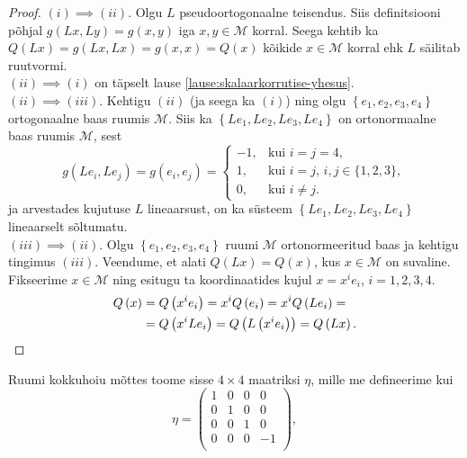 \documentclass[a4paper,12pt]{article}
\theoremstyle{plain}
\theoremstyle{definition}
\numberwithin{equation}{section}
\def\M{{\mathcal M}}
\begin{document}
\begin{proof}
$(i) \implies (ii)$. Olgu $L$ pseudoortogonaalne teisendus. Siis definitsiooni põhjal $g\left(Lx, Ly\right) = g\left(x, y\right)$ iga $x, y \in \M$ korral. Seega kehtib ka $Q\left(Lx\right) = g\left(Lx, Lx\right) = g\left(x, x\right) = Q\left(x\right)$ kõikide $x \in \M$ korral ehk $L$ säilitab ruutvormi. \\
$(ii) \implies (i)$ on täpselt lause \ref{lause:skalaarkorrutise-yhesus}. \\
$(ii) \implies (iii)$. Kehtigu $(ii)$ (ja seega ka $(i)$) ning olgu $\left\lbrace e_1, e_2, e_3, e_4 \right\rbrace$ ortogonaalne baas ruumis $\M$. Siis ka $\left\lbrace Le_1, Le_2, Le_3, Le_4 \right\rbrace$ on ortonormaalne baas ruumis $\M$, sest
\begin{equation*}
g \left(Le_i, Le_j\right) = g\left(e_i, e_j\right) = \begin{cases}
    -1,& \text{kui $i = j = 4$},\\
    1,& \text{kui $i = j$, $i,j \in \{1, 2, 3\}$},\\
    0,& \text{kui $i \neq j$}.
  \end{cases}
\end{equation*}
ja arvestades kujutuse $L$ lineaarsust, on ka süsteem $\left\lbrace Le_1, Le_2, Le_3, Le_4 \right\rbrace$ lineaarselt sõltumatu. \\
$(iii) \implies (ii)$. Olgu $\left\lbrace e_1, e_2, e_3, e_4 \right\rbrace$ ruumi $\M$ ortonormeeritud baas ja kehtigu tingimus $(iii)$. Veendume, et alati $Q\left(Lx\right) = Q\left(x\right)$, kus $x \in \M$ on suvaline. Fikseerime $x \in \M$ ning esitugu ta koordinaatides kujul $x = x^i e_i$, $i = 1, 2, 3, 4$.
\begin{align*}
Q\left(x\right) &= Q\left(x^i e_i\right) = x^i Q\left(e_i\right) = x^i Q\left(Le_i\right) = \\
&= Q\left(x^i L e_i\right) = Q\left(L\left(x^i e_i\right)\right) = Q\left(Lx\right). \qedhere
\end{align*}
\end{proof}
%
Ruumi kokkuhoiu mõttes toome sisse $4 \times 4$ maatriksi $\eta$, mille me defineerime kui
\begin{equation*}
\eta = \begin{pmatrix}
1 & 0 & 0 & 0 \\ 
0 & 1 & 0 & 0 \\  
0 & 0 & 1 & 0 \\ 
0 & 0 & 0 & -1 \\ 
\end{pmatrix},
\end{equation*}
\end{document}
